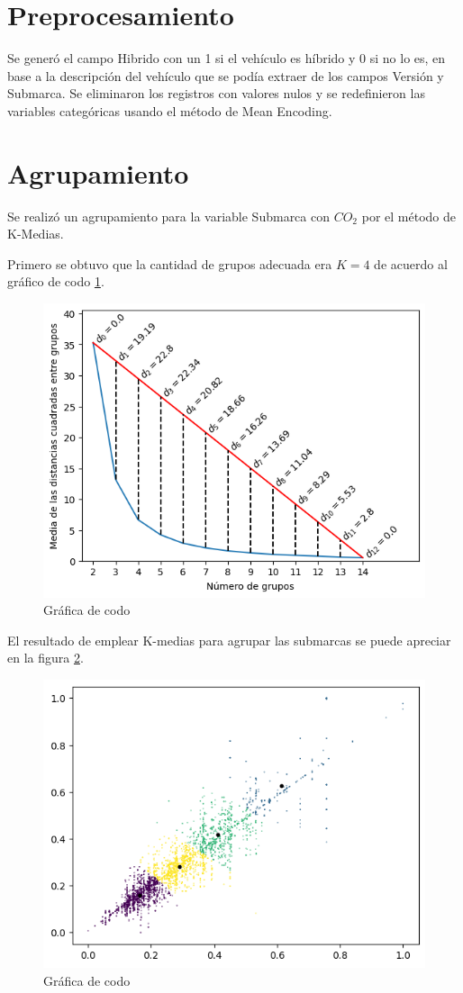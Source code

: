 \documentclass{article}
\begin{document}
\newpage

\section{Preprocesamiento}

Se generó el campo Hibrido con un 1 si el vehículo es híbrido y 0 si no lo es, en base a la descripción del vehículo que se podía extraer de los campos Versión y Submarca. Se eliminaron los registros con valores nulos y se redefinieron las variables categóricas usando el método de Mean Encoding.


\section{Agrupamiento}

Se realizó un agrupamiento para la variable Submarca con $CO_2$ por el método de K-Medias.

Primero se obtuvo que la cantidad de grupos adecuada era $K=4$ de acuerdo al gráfico de codo \ref{fig:figura2}.

\begin{figure}[h]
  \centering
  \includegraphics[width=.7\linewidth]{imagenes/2_codo.png}
  \caption{Gráfica de codo}
  \label{fig:figura2}
\end{figure}

\newpage

El resultado de emplear K-medias para agrupar las submarcas se puede apreciar en la figura \ref{fig:figura3}.

\begin{figure}[h]
  \centering
  \includegraphics[width=.65\linewidth]{imagenes/3_k-medias.png}
  \caption{Gráfica de codo}
  \label{fig:figura3}
\end{figure}
\end{document}
